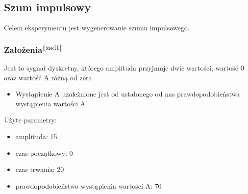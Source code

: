 \documentclass[12pt]{article}
\begin{document}
\subsection{Szum impulsowy}
Celem eksperymentu jest wygenerowanie szumu impulsowego.
\label{syg4}
\subsubsection{Założenia\( ^{[\ref{zad1}]}\)}
Jest to sygnał dyskretny, którego amplituda przyjmuje dwie wartości, wartość 0 oraz
wartość A różną od zera.
\begin{itemize}
\item  Wystąpienie A uzależnione jest od ustalonego od nas prawdopodobieństwa wystąpienia wartości A
\end{itemize}
Użyte parametry:
\begin{itemize}
\item amplituda: 15
\item czas początkowy: 0
\item czas trwania: 20
\item prawdopodobieństwo wystąpienia wartości A: 70
\end{itemize}
\end{document}
